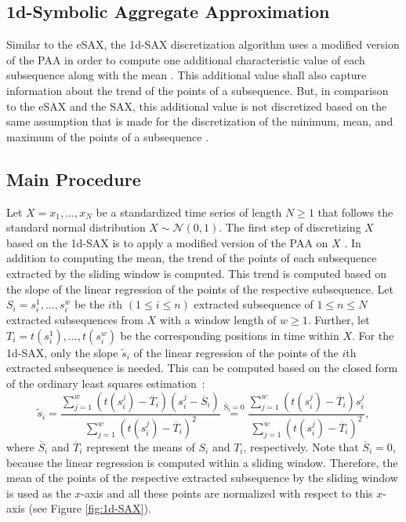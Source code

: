 \newpage
\subsection{1d-Symbolic Aggregate Approximation}
Similar to the \ac{eSAX}, the \ac{1d-SAX} discretization algorithm uses a modified version of the \ac{PAA} in order to compute one additional characteristic value of each subsequence along with the mean \cite{1d-SAX}. This additional value shall also capture information about the trend of the points of a subsequence. \newline
But, in comparison to the \ac{eSAX} and the \ac{SAX}, this additional value is not discretized based on the same assumption that is made for the discretization of the minimum, mean, and maximum of the points of a subsequence \cite{1d-SAX}.
\subsection*{Main Procedure}
Let $X = x_1, ..., x_N$ be a standardized time series of length $N \geq 1$ that follows the standard normal distribution $X \sim \mathcal{N}(0,1)$. The first step of discretizing $X$ based on the \ac{1d-SAX} is to apply a modified version of the PAA on $X$ \cite{1d-SAX}. In addition to computing the mean, the trend of the points of each subsequence extracted by the sliding window is computed. This trend is computed based on the slope of the linear regression of the points of the respective subsequence. Let  $S_i = s_{i}^1, ..., s_{i}^w$ be the $i$th $(1 \leq i \leq n)$ extracted subsequence of $1 \leq n \leq N$ extracted subsequences from $X$ with a window length of $w \geq 1$. Further, let $T_i = t(s_{i}^1), ..., t(s_{i}^w)$ be the corresponding positions in time within $X$. For the \ac{1d-SAX}, only the slope $\tilde{s}_i$ of the linear regression of the points of the $i$th extracted subsequence is needed. This can be computed based on the closed form of the ordinary least squares \mbox{estimation \cite{1d-SAX}:}
\begin{equation}
\tilde{s}_i = \frac{\sum_{j=1}^{w}(t(s_{i}^j)-\overline{T}_i)(s_{i}^j - \overline{S}_i)}{\sum_{j=1}^{w}(t(s_{i}^j)-\overline{T}_i)^2} \stackrel{\mathrm{\overline{S}_i = 0}}{=} \frac{\sum_{j=1}^{w}(t(s_{i}^j)-\overline{T}_i)s_{i}^j}{\sum_{j=1}^{w}(t(s_{i}^j)-\overline{T}_i)^2},
\label{eq:slope}
\end{equation}
where $\overline{S}_i$ and $\overline{T}_i$ represent the means of $S_i$ and $T_i$, respectively. Note that $\overline{S}_i = 0$, because the linear regression is computed within a sliding window. Therefore, the mean of the points of the respective extracted subsequence by the sliding window is used as the $x$-axis and all these points are normalized with respect to this $x$-axis (see Figure \ref{fig:1d-SAX}). \newline

